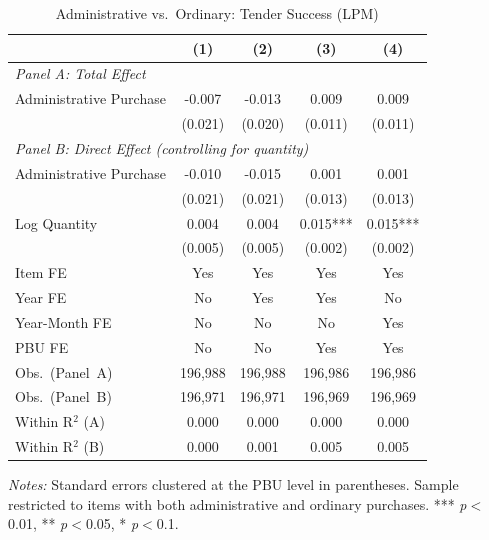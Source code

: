 \begin{table}[ht]
  \centering
  \caption{Administrative vs.\ Ordinary: Tender Success (LPM)}
  \label{tab:v8_adm_success}
  \small
  \begin{threeparttable}
  \begin{tabular}{lcccc}
    \hline\hline
    & (1) & (2) & (3) & (4) \\
    \hline
    \multicolumn{5}{l}{\textit{Panel A: Total Effect}} \\[3pt]
    Administrative Purchase & -0.007 & -0.013 & 0.009 & 0.009 \\
     & (0.021) & (0.020) & (0.011) & (0.011) \\[3pt]
    \hline
    \multicolumn{5}{l}{\textit{Panel B: Direct Effect (controlling for quantity)}} \\[3pt]
    Administrative Purchase & -0.010 & -0.015 & 0.001 & 0.001 \\
     & (0.021) & (0.021) & (0.013) & (0.013) \\[3pt]
    Log Quantity & 0.004 & 0.004 & 0.015*** & 0.015*** \\
     & (0.005) & (0.005) & (0.002) & (0.002) \\[3pt]
    \hline
    Item FE & Yes & Yes & Yes & Yes \\
    Year FE & No & Yes & Yes & No \\
    Year-Month FE & No & No & No & Yes \\
    PBU FE & No & No & Yes & Yes \\
    Obs.\ (Panel~A) & 196,988 & 196,988 & 196,986 & 196,986 \\
    Obs.\ (Panel~B) & 196,971 & 196,971 & 196,969 & 196,969 \\
    Within R$^2$ (A) & 0.000 & 0.000 & 0.000 & 0.000 \\
    Within R$^2$ (B) & 0.000 & 0.001 & 0.005 & 0.005 \\
    \hline\hline
  \end{tabular}
  \begin{tablenotes}
    \small
    \item \textit{Notes:} Standard errors clustered at the PBU level in parentheses. Sample restricted to items with both administrative and ordinary purchases. *** \textit{p}$<$0.01, ** \textit{p}$<$0.05, * \textit{p}$<$0.1.
  \end{tablenotes}
  \end{threeparttable}
\end{table}
